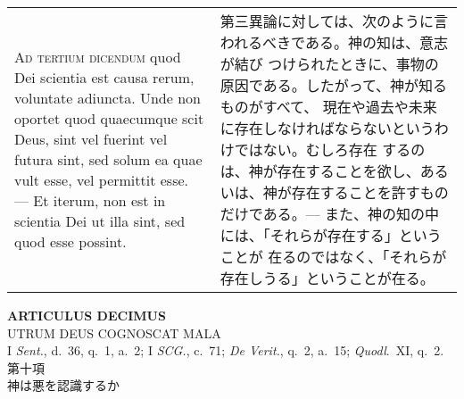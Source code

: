 \documentclass[10pt]{jsarticle} %
\begin{document}
\begin{longtable}{p{21em}p{21em}}
\\



{\scshape Ad tertium dicendum} quod Dei scientia est causa rerum,
voluntate adiuncta. Unde non oportet quod quaecumque scit Deus, sint
vel fuerint vel futura sint, sed solum ea quae vult esse, vel
permittit esse. --- Et iterum, non est in scientia Dei ut illa sint,
sed quod esse possint.


&


第三異論に対しては、次のように言われるべきである。神の知は、意志が結び
つけられたときに、事物の原因である。したがって、神が知るものがすべて、
現在や過去や未来に存在しなければならないというわけではない。むしろ存在
するのは、神が存在することを欲し、あるいは、神が存在することを許すもの
だけである。--- また、神の知の中には、「それらが存在する」ということが
在るのではなく、「それらが存在しうる」ということが在る。

\end{longtable}
\newpage



\begin{center}
{\Large {\bf ARTICULUS DECIMUS}}\\ {\large UTRUM DEUS COGNOSCAT
MALA}\\ {\footnotesize I {\itshape Sent.}, d.~36, q.~1, a.~2; I
{\itshape SCG.}, c.~71; {\itshape De Verit.}, q.~2, a.~15; {\itshape
Quodl}.~XI, q.~2.}\\ {\Large 第十項\\神は悪を認識するか}
\end{center}
\end{document}
